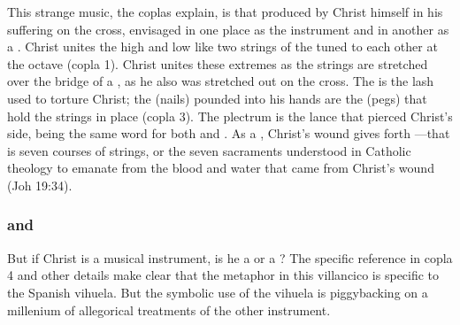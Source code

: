 
This strange music, the coplas explain, is that produced by Christ himself in
his suffering on the cross, envisaged in one place as the instrument
 and in another as a .
Christ unites the high and low like two strings of the  tuned to
each other at the octave (copla 1).  
Christ unites these extremes as the strings are stretched over the bridge of a
, as he also was stretched out on the cross.
The  is the lash used to torture Christ; the 
(nails) pounded into his hands are the  (pegs) that hold the
strings in place (copla 3).
The plectrum is the lance that pierced Christ's side,  being the
same word for both  and .
As a , Christ's wound gives forth ---that is
seven courses of strings, or the seven sacraments understood in Catholic
theology to emanate from the blood and water that came from Christ's wound (Joh
19:34).

\subsubsection{ and }

But if Christ is a musical instrument, is he a  or a
?  
The specific reference in copla 4 and other details make clear that the
metaphor in this villancico is specific to the Spanish 
vihuela.
But the symbolic use of the vihuela is piggybacking on a millenium of
allegorical treatments of the other instrument.

